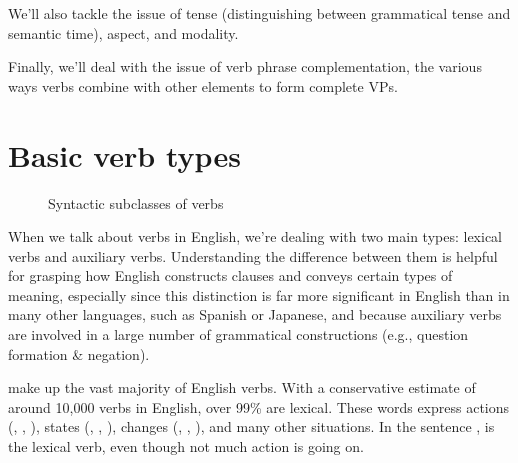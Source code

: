 We'll also tackle the issue of tense (distinguishing between grammatical tense and semantic time), aspect, and modality.

Finally, we'll deal with the issue of verb phrase complementation, the various ways verbs combine with other elements to form complete VPs.


\section{Basic verb types}\label{sec:basic-verb-types}

\begin{figure}
    \caption{Syntactic subclasses of verbs}
    \label{fig:verb-structure}
\end{figure}

\noindent When we talk about verbs in English, we're dealing with two main types: lexical verbs and auxiliary verbs. Understanding the difference between them is helpful for grasping how English constructs clauses and conveys certain types of meaning, especially since this distinction is far more significant in English than in many other languages, such as Spanish or Japanese, and because auxiliary verbs are involved in a large number of grammatical constructions (e.g., question formation \& negation).

 make up the vast majority of English verbs. With a conservative estimate of around 10,000 verbs in English, over 99\% are lexical. These words express actions (, , ), states (, , ), changes (, , ), and many other situations. In the sentence ,  is the lexical verb, even though not much action is going on.

